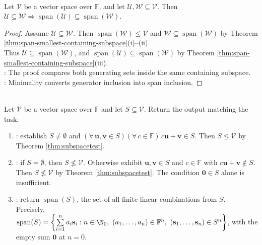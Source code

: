 \begin{proposition} \label{prop:spanmonotonicity} \\
Let $\mathcal{V}$ be a vector space over $\mathbb{F}$, and let $\mathcal{U},\mathcal{W}\subseteq\mathcal{V}$. Then $\mathcal{U}\subseteq\mathcal{W}\Rightarrow\operatorname{span}(\mathcal{U})\subseteq\operatorname{span}(\mathcal{W})$.
\begin{proof}
Assume $\mathcal{U}\subseteq\mathcal{W}$. Then $\operatorname{span}(\mathcal{W})\leq\mathcal{V}$ and $\mathcal{W}\subseteq\operatorname{span}(\mathcal{W})$ by Theorem \ref{thm:span-smallest-containing-subspace}(i)--(ii).\\
Thus $\mathcal{U}\subseteq\operatorname{span}(\mathcal{W})$, and $\operatorname{span}(\mathcal{U})\subseteq\operatorname{span}(\mathcal{W})$ by Theorem \ref{thm:span-smallest-containing-subspace}(iii).\\
: The proof compares both generating sets inside the same containing subspace.\\
: Minimality converts generator inclusion into span inclusion.
\end{proof}
\end{proposition}

\begin{computationmethod} \label{meth:subspace-diagnostic} \\
Let $\mathcal{V}$ be a vector space over $\mathbb{F}$ and let $S\subseteq\mathcal{V}$. Return the output matching the task:
\begin{enumerate}[label=(\roman*)]
\setlength{\itemsep}{0pt}
\item {}: establish $S\neq\emptyset$ and $(\forall\,\mathbf{u},\mathbf{v}\in S)(\forall\,c\in\mathbb{F})\,c\mathbf{u}+\mathbf{v}\in S$. Then $S\leq\mathcal{V}$ by Theorem \ref{thm:subspacetest}.
\item {}: if $S=\emptyset$, then $S\nleq\mathcal{V}$. Otherwise exhibit $\mathbf{u},\mathbf{v}\in S$ and $c\in\mathbb{F}$ with $c\mathbf{u}+\mathbf{v}\notin S$.\\
Then $S\nleq\mathcal{V}$ by Theorem \ref{thm:subspacetest}. The condition $\mathbf{0}\in S$ alone is insufficient.
\item {}: return $\operatorname{span}(S)$, the set of all finite linear combinations from $S$.\\
Precisely, $\operatorname{span}(S)=\left\{\sum\limits_{i=1}^{n}a_i\mathbf{s}_i:n\in\N_0,\ (a_1,\ldots,a_n)\in\mathbb{F}^n,\ (\mathbf{s}_1,\ldots,\mathbf{s}_n)\in S^n\right\}$, with the empty sum $\mathbf{0}$ at $n=0$.
\end{enumerate}
\end{computationmethod}
